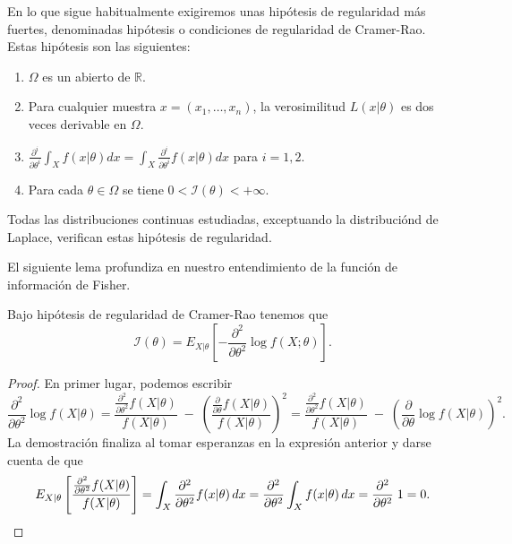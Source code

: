 \documentclass{article}
\begin{document}
    En lo que sigue habitualmente exigiremos unas hipótesis de regularidad más fuertes, denominadas hipótesis o condiciones de regularidad de Cramer-Rao. Estas hipótesis son las siguientes:

    \begin{enumerate}[label=\roman*)]
        \item $\Omega$ es un abierto de $\mathbb{R}$.
        \item Para cualquier muestra $x = (x_1, \ldots, x_n)$, la verosimilitud $L(x | \theta)$ es dos veces derivable en $\Omega$.
        \item $\frac{\partial^i}{\partial\theta^i} \int_X f(x | \theta) dx = \int_X \frac{\partial^i}{\partial\theta^i} f(x | \theta) dx$ para $i=1,2$.
        \item Para cada $\theta \in \Omega$ se tiene $0 < \mathcal{I}(\theta) < +\infty$.
    \end{enumerate}

    Todas las distribuciones continuas estudiadas, exceptuando la distribuciónd de Laplace, verifican estas hipótesis de regularidad.

    El siguiente lema profundiza en nuestro entendimiento de la función de información de Fisher.

    \begin{lem} \label{lem:fisher:2dev}
        Bajo hipótesis de regularidad de Cramer-Rao tenemos que
        \[\mathcal{I}(\theta) = E_{X|\theta} \left[-\frac{\partial^2}{\partial\theta^2} \log f(X;\theta) \right].\]
    \end{lem}
    \begin{proof}
        En primer lugar, podemos escribir
        \[\frac{\partial^2}{\partial\theta^2} \log f(X|\theta)=\frac{\frac{\partial^2}{\partial\theta^2} f(X|\theta)}{f(X| \theta)}\;-\;\left( \frac{\frac{\partial}{\partial\theta} f(X|\theta)}{f(X| \theta)} \right)^2=\frac{\frac{\partial^2}{\partial\theta^2} f(X|\theta)}{f(X| \theta)}\;-\;\left( \frac{\partial}{\partial\theta} \log f(X|\theta)\right)^2.\]
        La demostración finaliza al tomar esperanzas en la expresión anterior y darse cuenta de que
        \[E_{X|\theta}\left[\frac{\frac{\partial^2}{\partial\theta^2} f(X|\theta)}{f(X| \theta)}\right] = \int_X \frac{\partial^2}{\partial\theta^2} f(x | \theta)\, dx = \frac{\partial^2}{\partial\theta^2} \int_X f(x | \theta)\, dx = \frac{\partial^2}{\partial\theta^2} \; 1 = 0. \qedhere\]
    \end{proof}
\end{document}
